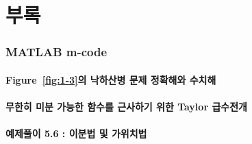 \documentclass{article}
\numberwithin{equation}{section}
\numberwithin{figure}{section}
\numberwithin{table}{section}
\numberwithin{algorithm}{section}
\theoremstyle{examplestyle}
\begin{document}
\part{부록}
\begin{appendices}

\section{MATLAB m-code}
\subsection{Figure~\ref{fig:1-3}의 낙하산병 문제 정확해와 수치해}

\clearpage 
\subsection{무한히 미분 가능한 함수를 근사하기 위한 Taylor 급수전개}\label{ap:2}
 
\clearpage
\subsection{예제풀이 5.6 : 이분법 및 가위치법}\label{ap:3}
 
 
 
 

\clearpage


\clearpage

\end{appendices}
\end{document}
